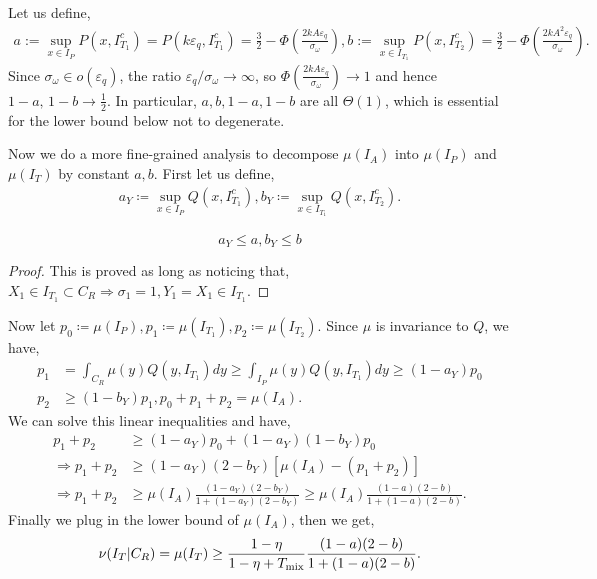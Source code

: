 \documentclass{article}
\begin{document}
Let us define, 
    \begin{align*}
        a:= \sup_{x\in I_P}P(x, I_{T_1}^c)=P(k\varepsilon_q, I_{T_1}^c) = \frac{3}{2}-\Phi\left(\frac{2kA\varepsilon_q}{\sigma_{\omega}}\right),
        b:= \sup_{x\in I_{T_1}} P(x, I_{T_2}^c)
        = \frac{3}{2}-\Phi\left(\frac{2kA^2\varepsilon_q}{\sigma_{\omega}}\right).
    \end{align*}
Since $\sigma_\omega \in o(\varepsilon_q)$, the ratio $\varepsilon_q/\sigma_\omega\to\infty$, so $\Phi\left(\frac{2kA\varepsilon_q}{\sigma_\omega}\right)\to 1$ and hence $1-a,\,1-b\to\frac{1}{2}$. In particular, $a,b,1-a,1-b$ are all $\Theta(1)$, which is essential for the lower bound below not to degenerate.







Now we do a more fine-grained analysis to decompose $\mu(I_A)$ into $\mu(I_P)$ and $\mu(I_T)$ by constant $a,b$. First let us define,
\begin{align*}
    a_Y\coloneqq  \sup_{x\in I_P}Q(x, I_{T_1}^c), b_Y\coloneqq \sup_{x\in I_{T_1}}Q(x,I_{T_2}^c).
\end{align*}
\begin{claim}
    \begin{equation*}
        a_Y\leq a, b_Y\leq b
    \end{equation*}
\end{claim}
\begin{proof}
    This is proved as long as noticing that,
    $X_1\in I_{T_1}\subset C_R\Rightarrow \sigma_1=1, Y_1=X_1\in I_{T_1}$.
\end{proof}

Now let $p_0\coloneqq \mu(I_P), p_1\coloneqq  \mu(I_{T_1}), p_2\coloneqq \mu(I_{T_2})$.
Since $\mu$ is invariance to $Q$, we have,
\begin{align*}
    p_1&=\int_{C_R}\mu(y)Q(y, I_{T_1})dy\geq \int_{I_P}\mu(y)Q(y, I_{T_1})dy\geq (1-a_Y)p_0\\
    p_2&\geq (1-b_Y)p_1, p_0+p_1+p_2 = \mu(I_A).
\end{align*}
We can solve this linear inequalities and have,
\begin{align*}
    p_1+p_2&\geq (1-a_Y)p_0+(1-a_Y)(1-b_Y)p_0\\
    \Rightarrow p_1+p_2&\geq (1-a_Y)(2-b_Y)[\mu(I_A)-(p_1+p_2)]\\
    \Rightarrow p_1+p_2&\geq \mu(I_A)\frac{(1-a_Y)(2-b_Y)}{1+(1-a_Y)(2-b_Y)} \geq \mu(I_A)\frac{(1-a)(2-b)}{1+(1-a)(2-b)}.
\end{align*}
Finally we plug in the lower bound of $\mu(I_A)$, then we get,
\begin{equation*}
    \nu(I_T|C_R)=\mu(I_T)\geq\frac{1-\eta}{1-\eta+T_{\textnormal{mix}}}\frac{(1-a)(2-b)}{1+(1-a)(2-b)}.
\end{equation*}
\end{document}
